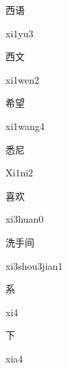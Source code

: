 \begin{multicols*}{2}
\begin{verbete}[xi1yu3]{西语}
\begin{pronuncia}{xi1yu3}
\end{pronuncia}
\end{verbete}

\begin{verbete}[xi1wen2]{西文}
\begin{pronuncia}{xi1wen2}
\end{pronuncia}
\end{verbete}

\begin{verbete}[xi1wang4]{希望}
\begin{pronuncia}{xi1wang4}
\end{pronuncia}
\end{verbete}

\begin{verbete}[Xi1ni2]{悉尼}
\begin{pronuncia}{Xi1ni2}
\end{pronuncia}
\end{verbete}

\begin{verbete}[xi3huan0]{喜欢}
\begin{pronuncia}{xi3huan0}
\end{pronuncia}
\end{verbete}

\begin{verbete}{洗手间}
\begin{pronuncia}{xi3shou3jian1}
\end{pronuncia}
\end{verbete}

\begin{verbete}[xi4]{系}
\begin{pronuncia}{xi4}
\end{pronuncia}
\end{verbete}

\begin{verbete}[xia4]{下}
\begin{pronuncia}{xia4}
\end{pronuncia}
\end{verbete}


\end{multicols*}
